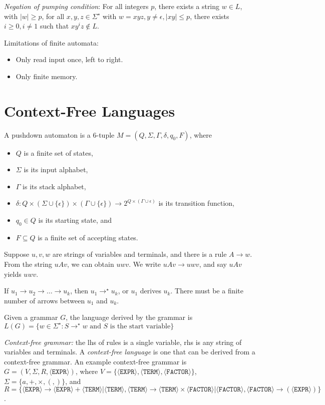 \documentclass[letterpaper,landscape,11pt]{article}
\begin{document}
\emph{Negation of pumping condition}: For all integers $p$, there exists a string $w \in L$, with $|w| \geq p$, for all $x, y, z \in \Sigma^\star$ with $w = xyz, y \neq \epsilon, |xy| \leq p$, there exists $i \geq 0, i \neq 1$ such that $xy^iz \notin L$.

Limitations of finite automata:
\begin{itemize}
	\item Only read input once, left to right.
	\item Only finite memory.
\end{itemize}

\section{Context-Free Languages}
A pushdown automaton is a 6-tuple $M = (Q, \Sigma, \Gamma, \delta, q_0, F)$, where
\begin{itemize}
	\item $Q$ is a finite set of states,
	\item $\Sigma$ is its input alphabet,
	\item $\Gamma$ is its stack alphabet,
	\item $\delta : Q \times (\Sigma \cup \{\epsilon\}) \times (\Gamma \cup \{\epsilon\}) \rightarrow 2^{Q \times (\Gamma \cup \epsilon)}$ is its transition function,
	\item $q_0 \in  Q$ is its starting state, and
	\item $F \subseteq Q$ is a finite set of accepting states.
\end{itemize}

Suppose $u, v, w$ are strings of variables and terminals, and there is a rule $A \rightarrow w$. From the string $uAv$, we can obtain $uwv$. We write $uAv \rightarrow uwv$, and say $uAv$ yields $uwv$.

If $u_1 \rightarrow u_2 \rightarrow \dots \rightarrow u_k$, then $u_1 \rightarrow^\star u_k$, or $u_1$ derives $u_k$. There must be a finite number of arrows between $u_1$ and $u_k$.

Given a grammar $G$, the language derived by the grammar is $L(G) = \{w \in \Sigma^\star : S \rightarrow^\star w \text{ and } S \text{ is the start variable}\}$

\emph{Context-free grammar:} the lhs of rules is a single variable, rhs is any string of variables and terminals. A \emph{context-free language} is one that can be derived from a context-free grammar. An example context-free grammar is $G = (V, \Sigma, R, \langle \texttt{EXPR} \rangle)$, where $V = \{\langle \texttt{EXPR} \rangle, \langle \texttt{TERM} \rangle, \langle \texttt{FACTOR} \rangle\}$, $\Sigma = \{a, +, \times, (, )\}$, and $R = \{\langle \texttt{EXPR} \rangle \rightarrow \langle \texttt{EXPR} \rangle + \langle \texttt{TERM} \rangle | \langle \texttt{TERM} \rangle, \langle \texttt{TERM} \rangle \rightarrow \langle \texttt{TERM} \rangle \times \langle \texttt{FACTOR} \rangle | \langle \texttt{FACTOR} \rangle, \langle \texttt{FACTOR} \rangle \rightarrow (\langle \texttt{EXPR} \rangle)\}$.
\end{document}
